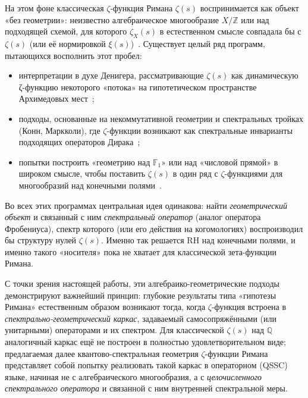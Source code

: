 \documentclass{article}
\numberwithin{equation}{section}
\theoremstyle{plain}
\theoremstyle{definition}
\theoremstyle{remark}
\begin{document}
\medskip

\noindent
На этом фоне классическая $\zeta$-функция Римана $\zeta(s)$ воспринимается как объект «без геометрии»: 
неизвестно алгебраическое многообразие $X/\mathbb Z$ или над подходящей схемой, для которого $\zeta_X(s)$ в естественном смысле совпадала бы с $\zeta(s)$ (или её нормировкой $\xi(s)$)~\cite{Serre1968,Deninger1998}. 
Существует целый ряд программ, пытающихся восполнить этот пробел:
\begin{itemize}
  \item интерпретации в духе Денигера, рассматривающие $\zeta(s)$ как динамическую ζ-функцию некоторого «потока» на гипотетическом пространстве Архимедовых мест~\cite{Deninger1998};
  \item подходы, основанные на некоммутативной геометрии и спектральных тройках (Конн, Маркколи), где $\zeta$-функции возникают как спектральные инварианты подходящих операторов Дирака~\cite{Connes1994,ConnesMarcolli2008};
  \item попытки построить «геометрию над $\mathbb F_1$» или над «числовой прямой» в широком смысле, чтобы поставить $\zeta(s)$ в один ряд с $\zeta$-функциями для многообразий над конечными полями~\cite{Kurokawa2005,Manin2008}.
\end{itemize}

\noindent
Во всех этих программах центральная идея одинакова: 
найти \emph{геометрический объект} и связанный с ним \emph{спектральный оператор} (аналог оператора Фробениуса), спектр которого (или его действия на когомологиях) воспроизводил бы структуру нулей $\zeta(s)$. 
Именно так решается RH над конечными полями, и именно такого «носителя» пока не хватает для классической зета-функции Римана.

\medskip

\noindent
С точки зрения настоящей работы, эти алгебраико-геометрические подходы демонстрируют важнейший принцип: 
глубокие результаты типа «гипотезы Римана» естественным образом возникают тогда, когда $\zeta$-функция встроена в \emph{спектрально-геометрический каркас}, задаваемый самосопряжёнными (или унитарными) операторами и их спектром. 
Для классической $\zeta(s)$ над $\mathbb Q$ аналогичный каркас ещё не построен в полностью удовлетворительном виде; предлагаемая далее квантово-спектральная геометрия $\zeta$-функции Римана представляет собой попытку реализовать такой каркас в операторном (QSSC) языке, начиная не с алгебраического многообразия, а с \emph{целочисленного спектрального оператора} и связанной с ним внутренней спектральной меры.
\end{document}
